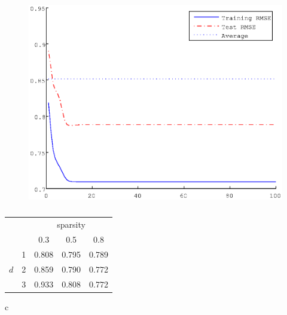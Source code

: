 \documentclass{article}
\begin{document}
\begin{figure}[h]
  \begin{center}
    \includegraphics[scale=0.7]{figure/lrem_typical_plot.eps}
  \end{center}
  \caption{}
  \label{fig:lrem_typical_plot.eps}
\end{figure}


\begin{table}[h]
 \caption{}
 \begin{center}
  \begin{tabular}{|c|c||c|c|c|}
    \hline
    \multicolumn{2}{|c|}{}  & \multicolumn{3}{|c|}{sparsity} \\
    \cline{3-5}
     \multicolumn{2}{|c|}{}    &  0.3  &  0.5  & 0.8   \\
    \hline
    \hline
       & 1 &  0.808  &  0.795  &  0.789  \\
    \cline{2-5}
     $d$ & 2 &  0.859  &  0.790  & 0.772   \\
    \cline{2-5}
     & 3 &  0.933  &  0.808  &  0.772  \\
    \hline
  \end{tabular}
 \end{center}
\end{table}


\if c\LaTeXe
\quad
\else
\end{document}

